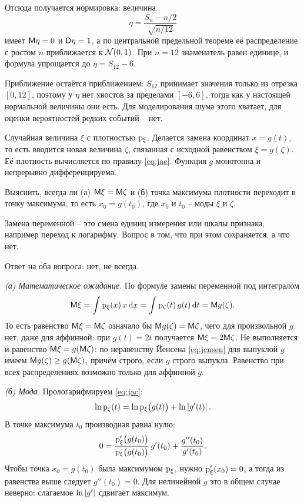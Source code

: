 \documentclass[12pt,a4paper]{article}
\begin{document}
\smallskip
Отсюда получается нормировка: величина
\[
  \eta = \frac{S_n - n/2}{\sqrt{n/12}}
\]
имеет $\mathsf{M}\eta = 0$ и $\mathsf{D}\eta = 1$, а по центральной предельной теореме её
распределение с ростом $n$ приближается к $\mathcal{N}(0,1)$. При $n = 12$
знаменатель равен единице, и формула упрощается до $\eta = S_{12} - 6$.

Приближение остаётся приближением: $S_{12}$ принимает значения только из
отрезка $[0,12]$, поэтому у $\eta$ нет хвостов за пределами $[-6,6]$, тогда как
у настоящей нормальной величины они есть. Для моделирования шума этого хватает,
для оценки вероятностей редких событий -- нет.

\dano Случайная величина $\xi$ с плотностью $\mathrm{p}_\xi$. Делается замена
координат $x = g(t)$, то есть вводится новая величина $\zeta$, связанная с
исходной равенством $\xi = g(\zeta)$. Её плотность вычисляется по правилу
\eqref{eq:jac}. Функция $g$ монотонна и непрерывно дифференцируема.

\treb Выяснить, всегда ли (а) $\mathsf{M}\xi = \mathsf{M}\zeta$ и (б) точка максимума
плотности переходит в точку максимума, то есть $x_0 = g(t_0)$, где $x_0$ и $t_0$
-- моды $\xi$ и $\zeta$.

\zachem Замена переменной -- это смена единиц измерения или шкалы признака,
например переход к логарифму. Вопрос в том, что при этом сохраняется, а что нет.

\resh Ответ на оба вопроса: нет, не всегда.

\emph{(а) Математическое ожидание.} По формуле замены переменной под интегралом
\[
  \mathsf{M}\xi = \int \mathrm{p}_\xi(x)\,x\,\mathrm{d} x
          = \int \mathrm{p}_\zeta(t)\,g(t)\,\mathrm{d} t
          = \mathsf{M} g(\zeta).
\]
То есть равенство $\mathsf{M}\xi = \mathsf{M}\zeta$ означало бы $\mathsf{M} g(\zeta) = \mathsf{M}\zeta$,
чего для произвольной $g$ нет, даже для аффинной: при $g(t) = 2t$ получается
$\mathsf{M}\xi = 2\mathsf{M}\zeta$. Не выполняется и равенство $\mathsf{M}\xi = g(\mathsf{M}\zeta)$: по
неравенству Йенсена \eqref{eq:jensen} для выпуклой $g$ имеем
$\mathsf{M} g(\zeta) \ge g(\mathsf{M}\zeta)$, причём строго, если $g$ строго выпукла.
Равенство при всех распределениях возможно только для аффинной $g$.

\emph{(б) Мода.} Прологарифмируем \eqref{eq:jac}:
\[
  \ln\mathrm{p}_\zeta(t) = \ln\mathrm{p}_\xi\bigl(g(t)\bigr) + \ln\left\lvert g'(t) \right\rvert .
\]
В точке максимума $t_0$ производная равна нулю:
\[
  0 = \frac{\mathrm{p}_\xi'\bigl(g(t_0)\bigr)}{\mathrm{p}_\xi\bigl(g(t_0)\bigr)}\,g'(t_0)
      + \frac{g''(t_0)}{g'(t_0)} .
\]
Чтобы точка $x_0 = g(t_0)$ была максимумом $\mathrm{p}_\xi$, нужно
$\mathrm{p}_\xi'(x_0) = 0$, а тогда из равенства выше следует $g''(t_0) = 0$. Для
нелинейной $g$ это в общем случае неверно: слагаемое $\ln\left\lvert g' \right\rvert$ сдвигает
максимум.
\end{document}
